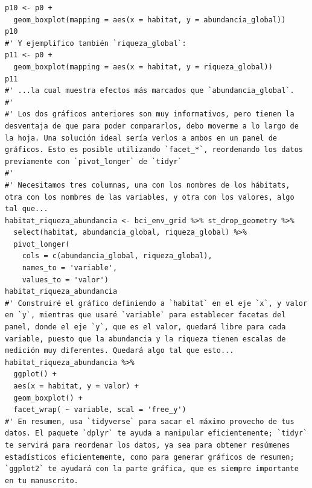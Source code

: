 \documentclass[11pt,]{article}
\begin{document}
\begin{verbatim}
p10 <- p0 +
  geom_boxplot(mapping = aes(x = habitat, y = abundancia_global))
p10
#' Y ejemplifico también `riqueza_global`:
p11 <- p0 +
  geom_boxplot(mapping = aes(x = habitat, y = riqueza_global))
p11
#' ...la cual muestra efectos más marcados que `abundancia_global`.
#' 
#' Los dos gráficos anteriores son muy informativos, pero tienen la desventaja de que para poder compararlos, debo moverme a lo largo de la hoja. Una solución ideal sería verlos a ambos en un panel de gráficos. Esto es posible utilizando `facet_*`, reordenando los datos previamente con `pivot_longer` de `tidyr`
#' 
#' Necesitamos tres columnas, una con los nombres de los hábitats, otra con los nombres de las variables, y otra con los valores, algo tal que...
habitat_riqueza_abundancia <- bci_env_grid %>% st_drop_geometry %>% 
  select(habitat, abundancia_global, riqueza_global) %>% 
  pivot_longer(
    cols = c(abundancia_global, riqueza_global),
    names_to = 'variable',
    values_to = 'valor')
habitat_riqueza_abundancia
#' Construiré el gráfico definiendo a `habitat` en el eje `x`, y valor en `y`, mientras que usaré `variable` para establecer facetas del panel, donde el eje `y`, que es el valor, quedará libre para cada variable, puesto que la abundancia y la riqueza tienen escalas de medición muy diferentes. Quedará algo tal que esto...
habitat_riqueza_abundancia %>% 
  ggplot() + 
  aes(x = habitat, y = valor) + 
  geom_boxplot() + 
  facet_wrap( ~ variable, scal = 'free_y')
#' En resumen, usa `tidyverse` para sacar el máximo provecho de tus datos. El paquete `dplyr` te ayuda a manipular eficientemente; `tidyr` te servirá para reordenar los datos, ya sea para obtener resúmenes estadísticos eficientemente, como para generar gráficos de resumen; `ggplot2` te ayudará con la parte gráfica, que es siempre importante en tu manuscrito.
\end{verbatim}
\end{document}
